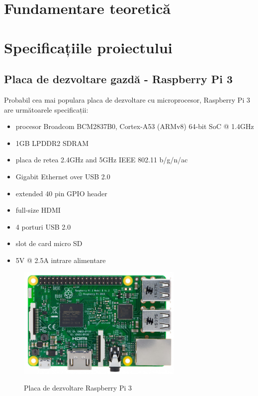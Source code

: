 \documentclass[12pt]{report}
\begin{document}
\chapter{Fundamentare teoretică}


\chapter{Specificațiile proiectului}
	\section{Placa de dezvoltare gazdă - Raspberry Pi 3}
Probabil cea mai populara placa de dezvoltare cu microprocesor, Raspberry Pi 3 are următoarele specificații:
\begin{itemize}
\item procesor Broadcom BCM2837B0, Cortex-A53 (ARMv8) 64-bit SoC @ 1.4GHz
\item 1GB LPDDR2 SDRAM
\item placa de retea 2.4GHz and 5GHz IEEE 802.11 b/g/n/ac
\item Gigabit Ethernet over USB 2.0
\item extended 40 pin GPIO header
\item full-size HDMI
\item 4 porturi USB 2.0
\item slot de card micro SD
\item 5V @ 2.5A intrare alimentare
\end{itemize}

\begin{figure}
		\centering
			{\includegraphics[width=80mm]{rpi.png}}
		\caption{Placa de dezvoltare Raspberry Pi 3}
\end{figure}
\end{document}
